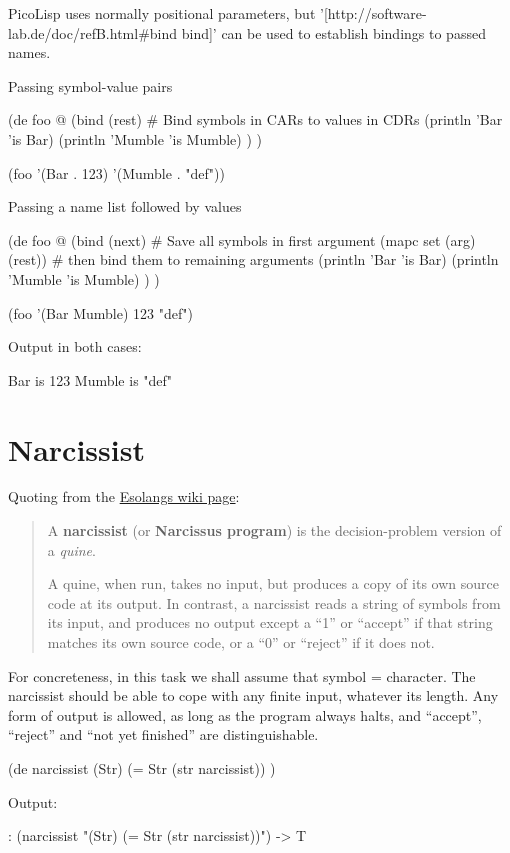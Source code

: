 \begin{wideverbatim}

PicoLisp uses normally positional parameters, but
'[http://software-lab.de/doc/refB.html#bind bind]' can be used
to establish bindings to passed names.

Passing symbol-value pairs

(de foo @
   (bind (rest)  # Bind symbols in CARs to values in CDRs
      (println 'Bar 'is Bar)
      (println 'Mumble 'is Mumble) ) )

(foo '(Bar . 123) '(Mumble . "def"))

Passing a name list followed by values

(de foo @
   (bind (next)                # Save all symbols in first argument
      (mapc set (arg) (rest))  # then bind them to remaining arguments
      (println 'Bar 'is Bar)
      (println 'Mumble 'is Mumble) ) )

(foo '(Bar Mumble) 123 "def")

Output in both cases:

Bar is 123
Mumble is "def"

\end{wideverbatim}

\pagebreak{}
\section*{Narcissist}

Quoting from the \href{http://esolangs.org/wiki/Narcissist}{Esolangs
wiki page}:

\begin{quote}
A \textbf{narcissist} (or \textbf{Narcissus program}) is the
decision-problem version of a \emph{quine}.

A quine, when run, takes no input, but produces a copy of its own source
code at its output. In contrast, a narcissist reads a string of symbols
from its input, and produces no output except a ``1'' or ``accept'' if
that string matches its own source code, or a ``0'' or ``reject'' if it
does not.
\end{quote}

For concreteness, in this task we shall assume that symbol = character.
The narcissist should be able to cope with any finite input, whatever
its length. Any form of output is allowed, as long as the program always
halts, and ``accept'', ``reject'' and ``not yet finished'' are
distinguishable.


\begin{wideverbatim}

(de narcissist (Str)
   (= Str (str narcissist)) )

Output:

: (narcissist "(Str) (= Str (str narcissist))")
-> T

\end{wideverbatim}

